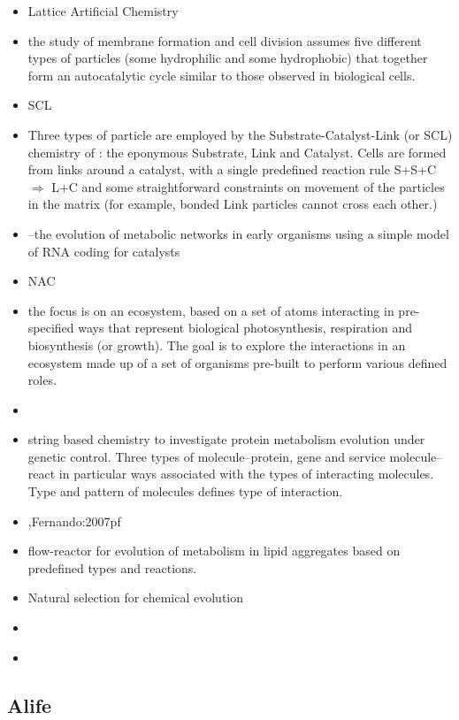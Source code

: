\begin{itemize}
	\item
 Lattice Artificial Chemistry \autocite{Madina2003,Ono2000}
	\item
 the study of membrane formation and cell division assumes five
 different types of particles (some hydrophilic and some hydrophobic)
 that together form an autocatalytic cycle similar to those observed in
 biological cells.
	\item
 SCL
	\item
 Three types of particle are employed by the Substrate-Catalyst-Link
 (or SCL) chemistry of \autocite{Varela:1974qd,Suzuki2008}: the
 eponymous Substrate, Link and Catalyst. Cells are formed from links
 around a catalyst, with a single predefined reaction rule
 S+S+C\(\Rightarrow\) L+C and some straightforward constraints on
 movement of the particles in the matrix (for example, bonded Link
 particles cannot cross each other.)
	\item
 \autocite{Flamm2010, Ullrich2010}--the evolution of metabolic networks in early
 organisms using a simple model of RNA coding for catalysts
	\item
 NAC
	\item
 \autocite{Dorin:2006fk} the focus is on an ecosystem, based on a set
 of atoms interacting in pre-specified ways that represent biological
 photosynthesis, respiration and biosynthesis (or growth). The goal is
 to explore the interactions in an ecosystem made up of a set of
 organisms pre-built to perform various defined roles.
	\item
 \autocite{Gardiner2007}
	\item
 string based chemistry to investigate protein metabolism evolution
 under genetic control. Three types of molecule--protein, gene and
 service molecule--react in particular ways associated with the types
 of interacting molecules. Type and pattern of molecules defines type
 of interaction.
	\item
 \autocite{Fernando:2008xy},Fernando:2007pf
	\item
 flow-reactor for evolution of metabolism in lipid aggregates based on
 predefined types and reactions.
	\item
 Natural selection for chemical evolution
	\item
 \autocite{Ganti:2003hl}
	\item
 \autocite{Dyson1999}
\end{itemize}

\subsection{Alife}\label{alife}

